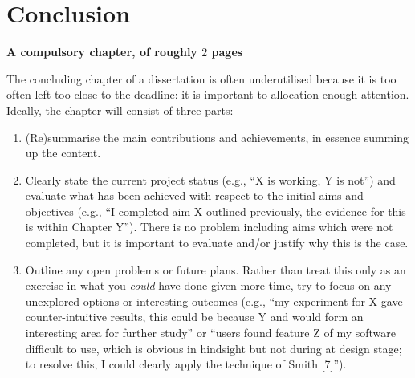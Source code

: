 \documentclass[ %
                    author={Jonathan Rankin},
                supervisor={Dr. David May, Dr. Ian Holyer},
                    degree={MEng},
                     title={CodeTouch},
                  subtitle={A Revolutionary Way To Program Real Code On Touch Screen Devices},
                      type={enterprise},
                      year={2015 } ]{dissertation}
\begin{document}

\chapter{Conclusion}
\label{chap:conclusion}

{\bf A compulsory chapter, of roughly $2$ pages} 
\vspace{1cm} 

\noindent
The concluding chapter of a dissertation is often underutilised because it 
is too often left too close to the deadline: it is important to allocation
enough attention.  Ideally, the chapter will consist of three parts:

\begin{enumerate}
\item (Re)summarise the main contributions and achievements, in essence
      summing up the content.
\item Clearly state the current project status (e.g., ``X is working, Y 
      is not'') and evaluate what has been achieved with respect to the 
      initial aims and objectives (e.g., ``I completed aim X outlined 
      previously, the evidence for this is within Chapter Y'').  There 
      is no problem including aims which were not completed, but it is 
      important to evaluate and/or justify why this is the case.
\item Outline any open problems or future plans.  Rather than treat this
      only as an exercise in what you {\em could} have done given more 
      time, try to focus on any unexplored options or interesting outcomes
      (e.g., ``my experiment for X gave counter-intuitive results, this 
      could be because Y and would form an interesting area for further 
      study'' or ``users found feature Z of my software difficult to use,
      which is obvious in hindsight but not during at design stage; to 
      resolve this, I could clearly apply the technique of Smith [7]'').
\end{enumerate}


%
%
\end{document}
